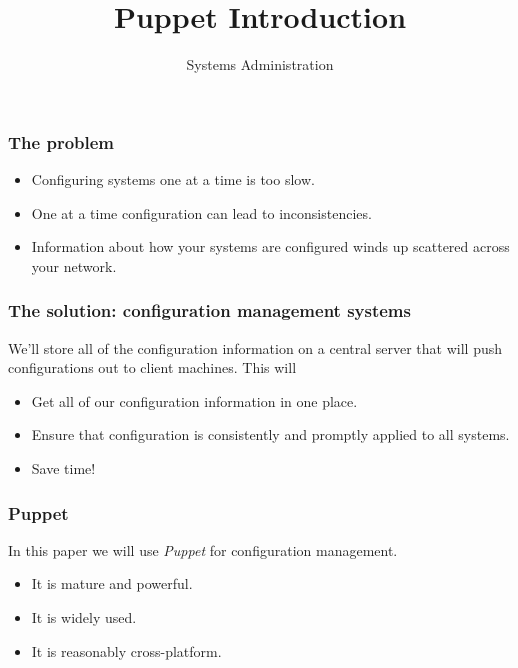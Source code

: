 \documentclass[10pt]{beamer}
\title{Puppet Introduction}
\author[IN719]{Systems Administration}
\institute[Otago Polytechnic]{
  Otago Polytechnic \\
  Dunedin, New Zealand \\
}
\date{}
\begin{document}
\begin{frame}[plain]
  \titlepage
\end{frame}

\begin{frame}
  \frametitle{The problem}

 \begin{itemize}
  \item Configuring systems one at a time is too slow.
  \item One at a time configuration can lead to inconsistencies.
  \item Information about how your systems are configured winds up scattered across your network.
  \end{itemize}



\end{frame}

\begin{frame}
  \frametitle{The solution: configuration management systems}

  We'll store all of the configuration information on a central server that will push configurations out to 
  client machines.  This will
  
  \begin{itemize}
  \item Get all of our configuration information in one place.
  \item Ensure that configuration is consistently and promptly applied to all systems.
  \item Save time!
  \end{itemize}

\end{frame}

\begin{frame}
  \frametitle{Puppet}

  In this paper we will use \emph{Puppet} for configuration management.
  
  \begin{itemize}
  \item It is mature and powerful.
  \item It is widely used.
  \item It is reasonably cross-platform.
  \end{itemize}

\end{frame}
\end{document}

